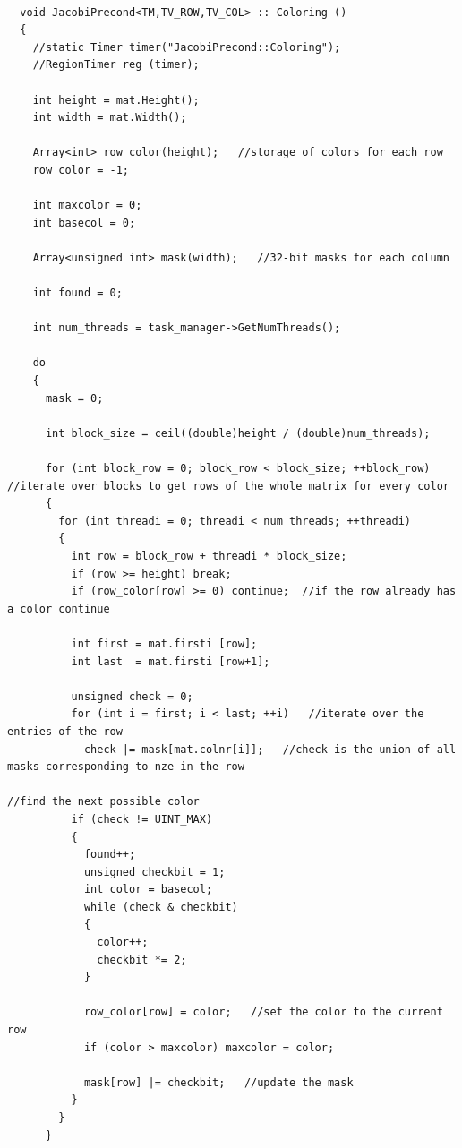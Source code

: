 \documentclass[a4paper,11pt]{scrartcl}
\begin{document}
\begin{lstlisting}

  void JacobiPrecond<TM,TV_ROW,TV_COL> :: Coloring ()
  {
    //static Timer timer("JacobiPrecond::Coloring");
    //RegionTimer reg (timer);

    int height = mat.Height();
    int width = mat.Width();

    Array<int> row_color(height);   //storage of colors for each row
    row_color = -1;

    int maxcolor = 0;
    int basecol = 0;

    Array<unsigned int> mask(width);   //32-bit masks for each column

    int found = 0;

    int num_threads = task_manager->GetNumThreads();

    do
    {
      mask = 0;

      int block_size = ceil((double)height / (double)num_threads);  

      for (int block_row = 0; block_row < block_size; ++block_row)  //iterate over blocks to get rows of the whole matrix for every color
      {
        for (int threadi = 0; threadi < num_threads; ++threadi)
        {
          int row = block_row + threadi * block_size;
          if (row >= height) break;
          if (row_color[row] >= 0) continue;  //if the row already has a color continue

          int first = mat.firsti [row];
          int last  = mat.firsti [row+1];

          unsigned check = 0;
          for (int i = first; i < last; ++i)   //iterate over the entries of the row
            check |= mask[mat.colnr[i]];   //check is the union of all masks corresponding to nze in the row

//find the next possible color
          if (check != UINT_MAX) 
          {
            found++;
            unsigned checkbit = 1;
            int color = basecol;
            while (check & checkbit)
            {
              color++;
              checkbit *= 2;
            }

            row_color[row] = color;   //set the color to the current row
            if (color > maxcolor) maxcolor = color;

            mask[row] |= checkbit;   //update the mask
          }
        }
      }


\end{lstlisting}
\end{document}

